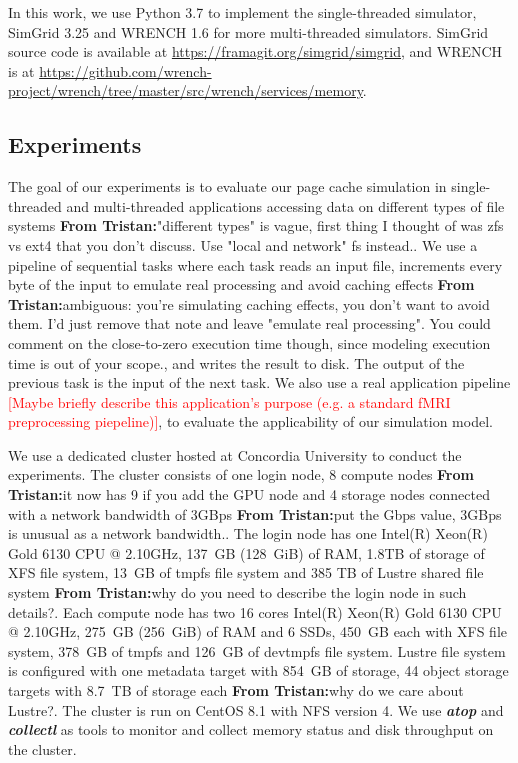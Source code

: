 \documentclass[conference]{IEEEtran}
\newcommand{\tristan}[1]{\color{orange}\textbf{From Tristan:}#1\color{black}}
\begin{document}
            In this work, we use Python 3.7 to implement the single-threaded simulator, 
            SimGrid 3.25 and WRENCH 1.6 for more multi-threaded simulators. 
            SimGrid source code is available at \url{https://framagit.org/simgrid/simgrid}, 
            and WRENCH is at 
            \url{https://github.com/wrench-project/wrench/tree/master/src/wrench/services/memory}.
            
        \subsection{Experiments}
        
            The goal of our experiments is to evaluate our page cache 
            simulation in single-threaded and multi-threaded applications
            accessing data on different types of file systems \tristan{"different types" is vague, first thing I thought of was zfs vs ext4 that you don't discuss. Use "local and network" fs instead.}. 
            We use a pipeline
            of sequential tasks where each task reads an input file, increments
            every byte of the input to emulate real processing and avoid caching
            effects \tristan{ambiguous: you're simulating caching effects, you don't want to avoid them. I'd just remove that note and leave "emulate real processing". You could comment on 
            the close-to-zero execution time though, since modeling execution time is out of your scope.}, and writes the result to disk. The output of the previous
            task is the input of the next task. We also use a real application 
            pipeline \textcolor{red}{[Maybe briefly describe this application's purpose (e.g. a standard fMRI preprocessing piepeline)]}, to evaluate the applicability of our simulation model. 
            
            We use a dedicated cluster hosted at Concordia University to conduct 
            the experiments. The cluster consists of one login node, 8 compute nodes \tristan{it now has 9 if you add the GPU node}
            and 4 storage nodes connected with a network bandwidth of 3GBps \tristan{put the Gbps value, 3GBps is unusual as a network bandwidth.}. 
            The login node has one Intel(R) Xeon(R) Gold 6130 CPU @ 2.10GHz, 
            137~GB (128~GiB) of RAM, 1.8TB of storage of XFS file system, 
            13~GB of tmpfs file system and 385 TB of Lustre shared file system \tristan{why do you need to describe the login node in such details?}. 
            Each compute node has two 16 cores Intel(R) Xeon(R) Gold 6130 CPU @ 2.10GHz, 
            275~GB (256~GiB) of RAM and 6 SSDs, 450~GB each with XFS file system, 
            378~GB of tmpfs and 126~GB of devtmpfs file system.
            Lustre file system is configured with one metadata target with 854~GB 
            of storage, 44 object storage targets with 8.7~TB of storage each \tristan{why do we care about Lustre?}. 
            The cluster is run on CentOS 8.1 with NFS version 4. 
            We use \textbf{\textit{atop}} and \textbf{\textit{collectl}} as tools to 
            monitor and collect memory status and disk throughput 
            on the cluster. 
            
\end{document}
